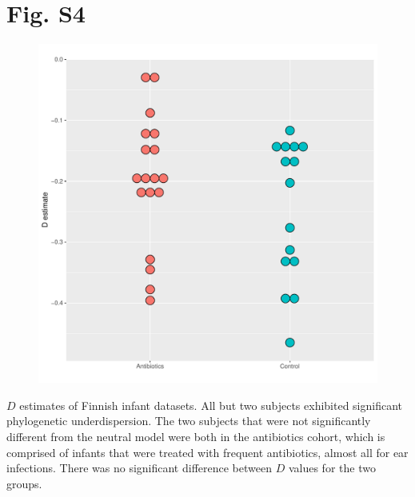 \documentclass{article}
\begin{document}
\section{Fig. S4}
\begin{figure}[ht]
	\centering
	\includegraphics[scale=0.80]{../Fig_S4.pdf}
\end{figure}
\(D\) estimates of Finnish infant datasets. All but two subjects exhibited significant phylogenetic underdispersion. The two subjects that were not significantly different from the neutral model were both in the antibiotics cohort, which is comprised of infants that were treated with frequent antibiotics, almost all for ear infections. There was no significant difference between \(D\) values for the two groups. 
\newpage
%
%
\end{document}
